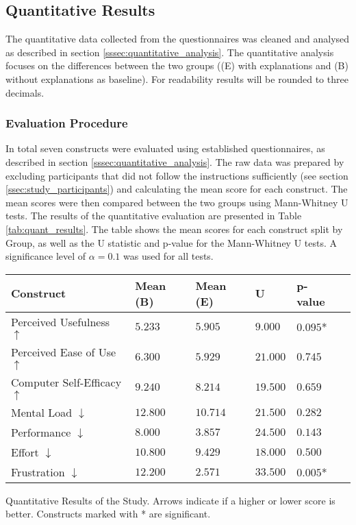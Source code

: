 \subsection{Quantitative Results} \label{ssec:quant_results}

The quantitative data collected from the questionnaires was cleaned and analysed as described in section \ref{sssec:quantitative_analysis}. The quantitative analysis focuses on the differences between the two groups ((E) with explanations and (B) without explanations as baseline).
For readability results will be rounded to three decimals.

\subsubsection{Evaluation Procedure} \label{sssec:eval_procedure}

In total seven constructs were evaluated using established questionnaires, as described in section \ref{sssec:quantitative_analysis}. The raw data was prepared by excluding participants that did not follow the instructions sufficiently (see section \ref{ssec:study_participants}) and calculating the mean score for each construct. The mean scores were then compared between the two groups using Mann-Whitney U tests. The results of the quantitative evaluation are presented in Table \ref{tab:quant_results}. The table shows the mean scores for each construct split by Group, as well as the U statistic and p-value for the Mann-Whitney U tests. A significance level of $\alpha = 0.1$ was used for all tests.

\begin{ctable}
    \begin{tabularx}{\textwidth}{l|X|X|X|X|X}
        \textbf{Construct} & \textbf{Mean (B)} & \textbf{Mean (E)} & \textbf{U} & \textbf{p-value} \\
        \hline
        Perceived Usefulness $\uparrow$ & $5.233$ &  $5.905$ &  $9.000$ &  $0.095$* \\
        Perceived Ease of Use $\uparrow$ & $6.300$ &  $5.929$ &  $21.000$ &  $0.745$ \\
        Computer Self-Efficacy $\uparrow$ & $9.240$ &  $8.214$ &  $19.500$ &  $0.659$ \\
        Mental Load $\downarrow$ & $12.800$ &  $10.714$ &  $21.500$ &  $0.282$ \\
        Performance $\downarrow$ & $8.000$ &  $3.857$ &  $24.500$ &  $0.143$ \\
        Effort $\downarrow$ & $10.800$ &  $9.429$ &  $18.000$ &  $0.500$ \\
        Frustration $\downarrow$ & $12.200$ &  $2.571$ &  $33.500$ &  $0.005$* \\
    \end{tabularx}
    \caption[Quantitative Results of the Study]{Quantitative Results of the Study. Arrows indicate if a higher or lower score is better. Constructs marked with * are significant.}
    \label{tab:quant_results}
\end{ctable}

